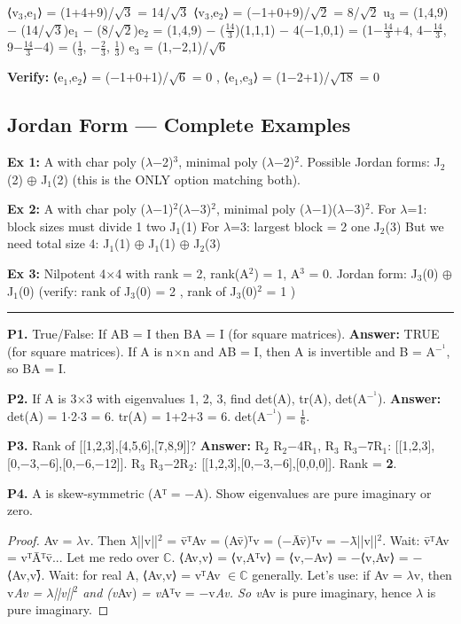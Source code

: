 \documentclass[12pt,a4paper,openany]{book}
\begin{document}
{{⟨v$_3$,e$_1$⟩ = (1+4+9)/$\sqrt{3}$ = 14/$\sqrt{3}$
⟨v$_3$,e$_2$⟩ = (−1+0+9)/$\sqrt{2}$ = 8/$\sqrt{2}$
u$_3$ = (1,4,9) − (14/$\sqrt{3}$)e$_1$ − (8/$\sqrt{2}$)e$_2$
= (1,4,9) − ($\frac{14}{3}$)(1,1,1) − 4(−1,0,1)
= (1−$\frac{14}{3}$+4, 4−$\frac{14}{3}$, 9−$\frac{14}{3}$−4) = ($\frac{1}{3}$, −$\frac{2}{3}$, $\frac{1}{3}$)
e$_3$ = (1,−2,1)/$\sqrt{6}$

\textbf{Verify:} ⟨e$_1$,e$_2$⟩ = (−1+0+1)/$\sqrt{6}$ = 0 , ⟨e$_1$,e$_3$⟩ = (1−2+1)/$\sqrt{18}$ = 0 

\subsection{Jordan Form — Complete Examples}

\textbf{Ex 1:} A with char poly ($\lambda$−2)$^3$, minimal poly ($\lambda$−2)$^2$.
Possible Jordan forms: J$_2$(2) $\oplus$ J$_1$(2) (this is the ONLY option matching both).

\textbf{Ex 2:} A with char poly ($\lambda$−1)$^2$($\lambda$−3)$^2$, minimal poly ($\lambda$−1)($\lambda$−3)$^2$.
For $\lambda$=1: block sizes must divide 1  two J$_1$(1)
For $\lambda$=3: largest block = 2  one J$_2$(3)
But we need total size 4: J$_1$(1) $\oplus$ J$_1$(1) $\oplus$ J$_2$(3) 

\textbf{Ex 3:} Nilpotent 4$\times$4 with rank = 2, rank(A$^2$) = 1, A$^3$ = 0.
Jordan form: J$_3$(0) $\oplus$ J$_1$(0) (verify: rank of J$_3$(0) = 2 , rank of J$_3$(0)$^2$ = 1 )

\bigskip\noindent\rule{\textwidth}{0.4pt}\bigskip


\textbf{P1.} True/False: If AB = I then BA = I (for square matrices).
\textbf{Answer:} TRUE (for square matrices). If A is n$\times$n and AB = I, then A is invertible and B = A$^{-}^1$, so BA = I.

\textbf{P2.} If A is 3$\times$3 with eigenvalues 1, 2, 3, find det(A), tr(A), det(A$^{-}^1$).
\textbf{Answer:} det(A) = 1$\cdot$2$\cdot$3 = 6. tr(A) = 1+2+3 = 6. det(A$^{-}^1$) = $\frac{1}{6}$.

\textbf{P3.} Rank of [[1,2,3],[4,5,6],[7,8,9]]?
\textbf{Answer:} R$_2$  R$_2$−4R$_1$, R$_3$  R$_3$−7R$_1$: [[1,2,3],[0,−3,−6],[0,−6,−12]]. R$_3$  R$_3$−2R$_2$: [[1,2,3],[0,−3,−6],[0,0,0]]. Rank = \textbf{2}.

\textbf{P4.} A is skew-symmetric (Aᵀ = −A). Show eigenvalues are pure imaginary or zero.
\begin{proof}
Av = $\lambda$v. Then $\lambda$̄||v||$^2$ = v̄ᵀAv = (Av̄)ᵀv = (−Āv̄)ᵀv = −$\lambda$̄||v||$^2$. Wait: v̄ᵀAv = vᵀĀᵀv̄... Let me redo over $\mathbb{C}$. ⟨Av,v⟩ = ⟨v,Aᵀv⟩ = ⟨v,−Av⟩ = −⟨v,Av⟩ = −⟨Av,v⟩̄. Wait: for real A, ⟨Av,v⟩ = vᵀAv $\in\mathbb{C}$ generally. Let's use: if Av = $\lambda$v, then v\textit{Av = $\lambda$||v||$^2$ and (v}Av)\textit{ = v}Aᵀv = −v\textit{Av. So v}Av is pure imaginary, hence $\lambda$ is pure imaginary.
\end{proof}

}}
\end{document}
